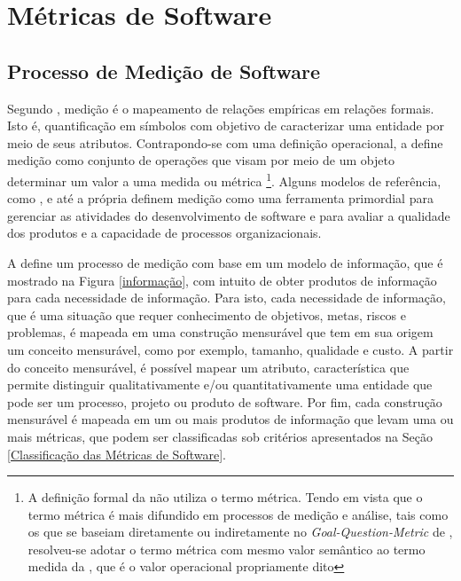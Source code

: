 \chapter{Métricas de Software}
\label{chap:metricas}

\section{Processo de Medição de Software}

Segundo , medição é o mapeamento de relações empíricas em relações formais. Isto é, quantificação em símbolos com objetivo de caracterizar uma entidade por meio de seus atributos. Contrapondo-se com uma definição operacional, a  define medição como conjunto de operações que visam por meio de um objeto determinar um valor a uma medida ou métrica \footnote{A definição formal da  não utiliza o termo métrica. Tendo em vista que o termo métrica é mais difundido em processos de medição e análise, tais como os que se baseiam diretamente ou indiretamente no \textit{Goal-Question-Metric} de , resolveu-se adotar o termo métrica com mesmo valor semântico ao termo medida da , que é o valor operacional propriamente dito}. Alguns modelos de referência, como , e até a própria  definem medição como uma ferramenta primordial para gerenciar as atividades do desenvolvimento de software e para avaliar a qualidade dos produtos e a capacidade de processos organizacionais. 


A  define um processo de medição com base em um modelo de
informação, que é mostrado na Figura \ref{informação}, com intuito de obter produtos de informação para cada necessidade de informação. Para isto, cada necessidade de informação, que é uma situação que requer conhecimento de objetivos, metas, riscos e problemas, é mapeada em uma construção  mensurável que tem em sua origem um conceito mensurável, como por exemplo, tamanho, qualidade e custo. A partir do conceito mensurável, é possível mapear um atributo, característica que permite distinguir qualitativamente e/ou quantitativamente uma entidade que pode ser um processo, projeto ou produto de software. Por fim, cada construção mensurável é mapeada em um ou mais produtos de informação que levam uma ou mais métricas, que podem ser classificadas sob  critérios apresentados na Seção \ref{Classificação das Métricas de Software}.


